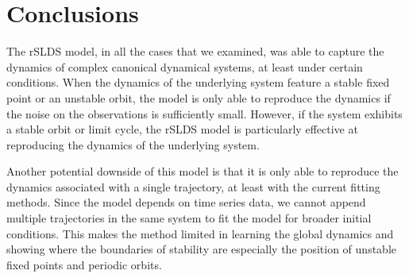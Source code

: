 \section{Conclusions}

The rSLDS model, in all the cases that we examined, was able to capture the dynamics of complex canonical dynamical systems, at least under certain conditions. When the dynamics of the underlying system feature a stable fixed point or an unstable orbit, the model is only able to reproduce the dynamics if the noise on the observations is sufficiently small. However, if the system exhibits a stable orbit or limit cycle, the rSLDS model is particularly effective at reproducing the dynamics of the underlying system.

Another potential downside of this model is that it is only able to reproduce the dynamics associated with a single trajectory, at least with the current fitting methods. Since the model depends on time series data, we cannot append multiple trajectories in the same system to fit the model for broader initial conditions. This makes the method limited in learning the global dynamics and showing where the boundaries of stability are especially the position of unstable fixed points and periodic orbits.

\begin{comment}
The method can be very successfully applied to systems with a periodic orbit or strange attractor and the goal is to find the dynamics of this orbit. We can remark that this method is very limited in its ability to give an estimation on linear estimation the global dynamics. Unlike the SINDY algorithm \cite{} it is currently not possible to learn from data from multiple trajectories. This makes the method limited in learning the global dynamics and showing where the boundaries of stability are especially the position of unstable fixed points and periodic orbits. This makes the method only applicable for initial conditions that lead to periodic or bounded trajectories. The extension of implementing the ability to handle multiple trajectories will enhance the range of problems this method can be applied to.
\end{comment}
